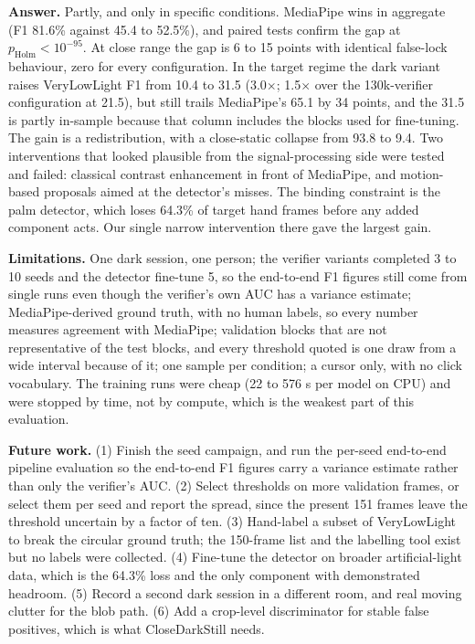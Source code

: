 \documentclass[conference,a4paper]{IEEEtran}
\begin{document}
\textbf{Answer.} Partly, and only in specific conditions. MediaPipe wins in
aggregate (F1 81.6\% against 45.4 to 52.5\%), and paired tests confirm the
gap at $p_{\text{Holm}}<10^{-95}$. At close range the gap is 6 to 15 points
with identical false-lock behaviour, zero for every configuration. In the
target regime the dark variant raises VeryLowLight F1 from 10.4 to 31.5
(3.0$\times$; 1.5$\times$ over the 130k-verifier configuration at 21.5), but
still trails MediaPipe's 65.1 by 34 points, and the 31.5 is partly
in-sample because that column includes the blocks used for fine-tuning. The
gain is a redistribution, with a close-static collapse from 93.8 to 9.4. Two
interventions that looked plausible from the signal-processing side were
tested and failed: classical contrast enhancement in front of MediaPipe,
and motion-based proposals aimed at the detector's misses. The binding
constraint is the palm detector, which loses 64.3\% of target hand frames
before any added component acts. Our single narrow intervention there gave
the largest gain.

\textbf{Limitations.} One dark session, one person; the verifier variants
completed 3 to 10 seeds and the detector fine-tune 5, so the end-to-end F1
figures still come from single runs even though the verifier's own AUC has
a variance estimate; MediaPipe-derived ground truth, with no human labels,
so every number measures agreement with MediaPipe; validation blocks that
are not representative of the test blocks, and every threshold quoted is
one draw from a wide interval because of it; one sample per condition; a
cursor only, with no click vocabulary. The training runs were cheap (22 to
576 s per model on CPU) and were stopped by time, not by compute, which is
the weakest part of this evaluation.

\textbf{Future work.} (1) Finish the seed campaign, and run the per-seed
end-to-end pipeline evaluation so the end-to-end F1 figures carry a variance
estimate rather than only the verifier's AUC. (2) Select thresholds on more
validation frames, or select them per seed and report the spread, since the
present 151 frames leave the threshold uncertain by a factor of ten. (3)
Hand-label a subset of VeryLowLight to break the circular ground truth; the
150-frame list and the labelling tool exist but no labels were collected.
(4) Fine-tune the detector on broader artificial-light data, which is the
64.3\% loss and the only component with demonstrated headroom. (5) Record a
second dark session in a different room, and real moving clutter for the
blob path. (6) Add a crop-level discriminator for stable false positives,
which is what CloseDarkStill needs.
\end{document}

